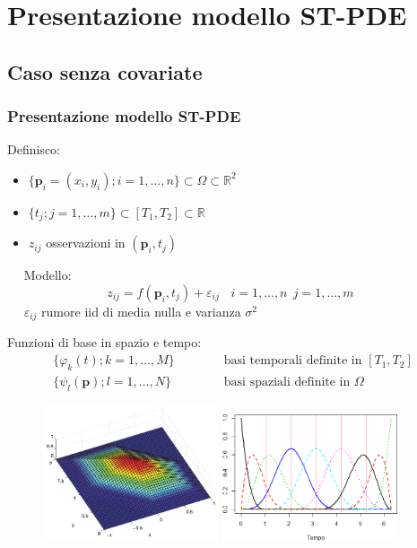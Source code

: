 \documentclass[landscape,9pt]{beamer}                           %
\begin{document}
\section{Presentazione modello ST-PDE}
\subsection{Caso senza covariate}
\begin{frame}
\frametitle{Presentazione modello ST-PDE}
Definisco:
\begin{itemize}
\item $\{\bm{p}_i = (x_i,y_i); i=1, \ldots , n\} \subset \Omega \subset \mathbb{R}^2$
\item $\{t_j ; j=1, \ldots , m\} \subset [T_1,T_2]\subset \mathbb{R}$
\item $z_{ij}$ osservazioni in $(\bm{p}_i,t_j)$
\end{itemize}
\ \ 
\newline
Modello:
$$
z_{ij}=f(\bm{p}_i,t_j)+\varepsilon_{ij}\ \ \ \ i = 1,\ldots,n\ \ j=1,\ldots,m \ \ 
$$
\ \ 
\newline
$\varepsilon_{ij}$ rumore iid di media nulla e varianza $\sigma^2$
\end{frame}

\begin{frame}
Funzioni di base in spazio e tempo:
\begin{eqnarray*}
\{ \varphi_k(t);k = 1, \ldots , M \} &\qquad & \mbox{ basi temporali definite in } [T_1,T_2] \\
\{ \psi_l(\bm{p});l = 1, \ldots , N \} &\qquad & \mbox{ basi spaziali definite in } \Omega
\end{eqnarray*}
\begin{figure}[t]
	\centering
	\subfigure
	{
	\includegraphics[width=0.46\textwidth]{Immagini/elementofinito.jpg}  
   }
	\subfigure
   {
	\includegraphics[width=0.46\textwidth]{Immagini/Bsplines.png}
   }
\end{figure}
\end{frame}
\end{document}
